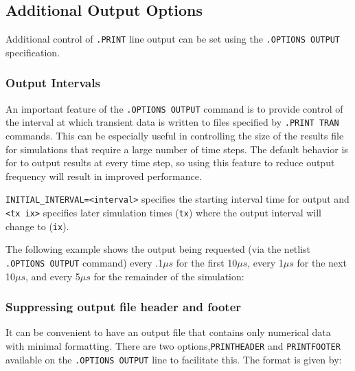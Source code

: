 \newpage
\subsection{Additional Output Options}
\label{Additional_Output}

Additional control of \texttt{.PRINT} line output can be set using the 
\texttt{.OPTIONS OUTPUT} specification.

\subsubsection{Output Intervals}
An important feature of the \texttt{.OPTIONS OUTPUT} command is to provide 
control of the interval at which transient data is written to files specified by 
\texttt{.PRINT TRAN} commands.  This can be
especially useful in controlling the size of the results file for
simulations that require a large number of time steps.  
The default behavior is for \Xyce{} to output results at every time step, so 
using this feature to reduce output frequency will result in improved performance.


\texttt{INITIAL\_INTERVAL=<interval>} specifies the starting interval time
for output and \texttt{<tx ix>} specifies later simulation times (\texttt{tx})
where the output interval will change to (\texttt{ix}).

The following example shows the output being requested (via the netlist
\texttt{.OPTIONS OUTPUT} command) every .1$\mu s$ for the first 10$\mu s$,
every 1$\mu s$ for the next 10$\mu s$, and every 5$\mu s$ for the remainder of
the simulation:


\subsubsection{Suppressing output file header and footer}

It can be convenient to have an output file that contains only numerical data with 
minimal formatting.  There are two options,\texttt{PRINTHEADER} and \texttt{PRINTFOOTER} 
available on the \texttt{.OPTIONS OUTPUT} line to facilitate this. The format
is given by:

